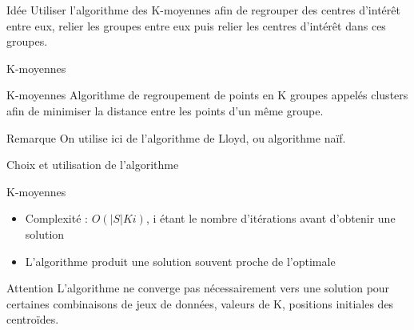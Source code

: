 \documentclass[aspectratio=43,11pt]{beamer}
\begin{document}
\begin{frame}{Idée}
    Utiliser l'algorithme des K-moyennes afin de regrouper des centres d'intérêt entre eux, relier les groupes entre eux puis relier les centres d'intérêt dans ces groupes.
\end{frame}
\begin{frame}{K-moyennes}
    \begin{block}{K-moyennes}
        Algorithme de regroupement de points en K groupes appelés clusters afin de minimiser la distance entre les points d'un même groupe.
    \end{block}
    \begin{exampleblock}{Remarque}
        On utilise ici de l'algorithme de Lloyd, ou algorithme naïf.
    \end{exampleblock}
\end{frame}
\begin{frame}{Choix et utilisation de l'algorithme}
\end{frame}
\begin{frame}{K-moyennes}
    \begin{itemize}
        \item Complexité : $O(|S| K i)$, i étant le nombre d'itérations avant d'obtenir une solution
        \item L'algorithme produit une solution souvent proche de l'optimale
    \end{itemize}
    \begin{alertblock}{Attention}
        L'algorithme ne converge pas nécessairement vers une solution pour certaines combinaisons de jeux de données, valeurs de K, positions initiales des centroïdes.
    \end{alertblock}
\end{frame}
\end{document}

